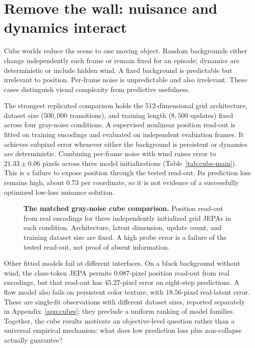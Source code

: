 \section{Remove the wall: nuisance and dynamics interact}
\label{sec:cubes}

Cube worlds reduce the scene to one moving object. Random backgrounds either change independently
each frame or remain fixed for an episode; dynamics are deterministic or include hidden wind.
A fixed background is predictable but irrelevant to position. Per-frame noise is unpredictable and
also irrelevant. These cases distinguish visual complexity from predictive usefulness.

The strongest replicated comparison holds the 512-dimensional grid architecture, dataset size
($500{,}000$ transitions), and training length ($8{,}500$ updates) fixed across four gray-noise
conditions. A supervised nonlinear position read-out is fitted on training encodings and evaluated
on independent evaluation frames. It achieves subpixel error whenever either the background is
persistent or dynamics are deterministic. Combining per-frame noise with wind raises error to
$21.33\pm0.06$ pixels across three model initializations (Table~\ref{tab:cube-main}). This is a
failure to expose position through the tested read-out. Its prediction loss remains high, about
$0.73$ per coordinate, so it is not evidence of a successfully optimized low-loss nuisance solution.

\begin{figure}[t]
\centering
{}
\caption{\textbf{The matched gray-noise cube comparison.} Position read-out from real encodings
for three independently initialized grid JEPAs in each condition. Architecture,
latent dimension, update count, and training dataset size are fixed. A high probe error is a failure
of the tested read-out, not proof of absent information.}
\label{fig:cube-readout}
\end{figure}

\begin{table}[t]
\centering
\caption{\textbf{A matched nuisance--dynamics interaction.} Grid-JEPA position L1 error in pixels,
mean $\pm$ sample standard deviation across three model fits. The same supervised read-out is
applied to real encodings and eight-step predictions; the latter can also reflect read-out
extrapolation. Predicted-window evaluation excludes resets and uses overlapping windows.}
\label{tab:cube-main}
\end{table}

Other fitted models fail at different interfaces. On a black background without wind, the
class-token JEPA permits $0.087$-pixel position read-out from real encodings, but that read-out has
$45.27$-pixel error on eight-step predictions. A flow model also fails on persistent color texture,
with $18.56$-pixel real-latent error. These are single-fit observations with different dataset sizes,
reported separately in Appendix~\ref{app:cubes}; they preclude a uniform ranking of model families.
Together, the cube results motivate an objective-level question rather than a universal empirical
mechanism: what does low prediction loss plus non-collapse actually guarantee?
